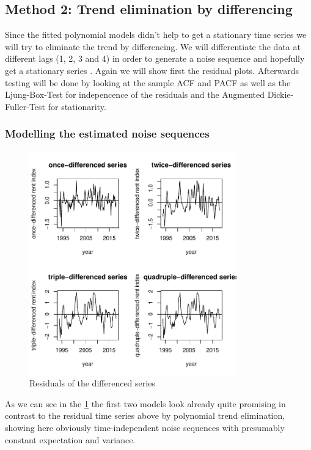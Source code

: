 \documentclass[11pt,a4paper]{article}
\begin{document}
\subsection{Method 2: Trend elimination by differencing}
Since the fitted polynomial models didn't help to get a stationary time series we will try to eliminate the trend by differencing.
We will differentiate the data at different lags (1, 2, 3 and 4) in order to generate a noise sequence and hopefully get a stationary series \citep[p.~35]{bd02}.
Again we will show first the residual plots. Afterwards testing will be done by looking at the sample ACF and PACF as well as the Ljung-Box-Test for indepencence of the residuals and the Augmented Dickie-Fuller-Test for stationarity.


\subsubsection{Modelling the estimated noise sequences}

\begin{figure} 
    \centering
    \includegraphics[width=0.8\textwidth]{resid_diff_all}
    \caption{Residuals of the differenced series}
    \label{fig:resid_diff_all}
\end{figure}

As we can see in the \cref{fig:resid_diff_all} the first two models look already quite promising in contrast to the residual time series above by polynomial trend elimination, showing here obviously time-independent noise sequences with presumably constant expectation and variance.
\end{document}

